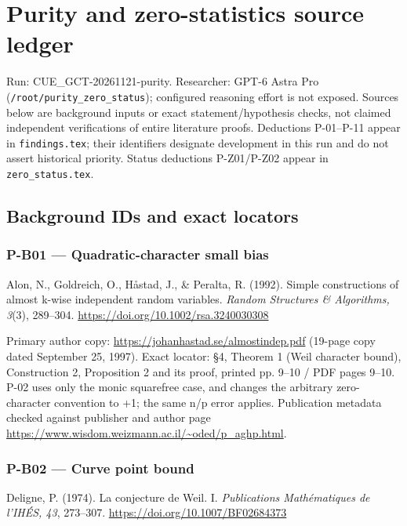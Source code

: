 \documentclass[11pt,a4paper]{article}
\theoremstyle{definition}\newtheorem{definition}{Definition}
\begin{document}
\section{Purity and zero-statistics source
ledger}\label{purity-and-zero-statistics-source-ledger}

Run: CUE\_GCT-20261121-purity. Researcher: GPT-6 Astra Pro
(\nolinkurl{/root/purity_zero_status}); configured reasoning effort is
not exposed. Sources below are background inputs or exact
statement/hypothesis checks, not claimed independent verifications of
entire literature proofs. Deductions P-01--P-11 appear in
\nolinkurl{findings.tex}; their identifiers designate development in this
run and do not assert historical priority. Status deductions P-Z01/P-Z02
appear in \nolinkurl{zero_status.tex}.

\subsection{Background IDs and exact
locators}\label{background-ids-and-exact-locators}

\subsubsection{P-B01 --- Quadratic-character small
bias}\label{p-b01--quadratic-character-small-bias}

Alon, N., Goldreich, O., Håstad, J., \& Peralta, R. (1992). Simple
constructions of almost k-wise independent random variables.
\emph{Random Structures \& Algorithms, 3}(3), 289--304.
\url{https://doi.org/10.1002/rsa.3240030308}

Primary author copy: \url{https://johanhastad.se/almostindep.pdf}
(19-page copy dated September 25, 1997). Exact locator: §4, Theorem 1
(Weil character bound), Construction 2, Proposition 2 and its proof,
printed pp. 9--10 / PDF pages 9--10. P-02 uses only the monic squarefree
case, and changes the arbitrary zero-character convention to +1; the
same n/p error applies. Publication metadata checked against publisher
and author page
\url{https://www.wisdom.weizmann.ac.il/~oded/p_aghp.html}.

\subsubsection{P-B02 --- Curve point
bound}\label{p-b02--curve-point-bound}

Deligne, P. (1974). La conjecture de Weil. I. \emph{Publications
Mathématiques de l'IHÉS, 43}, 273--307.
\url{https://doi.org/10.1007/BF02684373}
\end{document}
